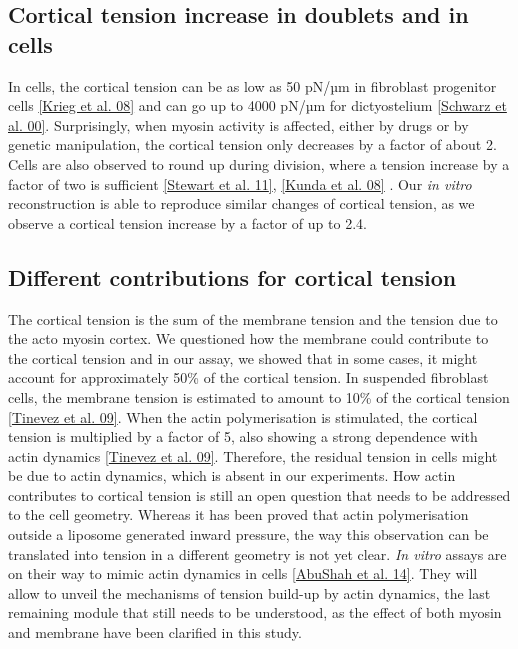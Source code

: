 \documentclass[A4paperpaper,11pt,english]{sphinxmanual}
\begin{document}
\subsection{Cortical tension increase in doublets and in cells}
\label{parts/part4:cortical-tension-increase-in-doublets-and-in-cells}
In cells, the cortical tension can be as low as 50 pN/µm in fibroblast progenitor
cells {\hyperref[parts/part4:krieg2008]{{[}Krieg et al. 08{]}}} and can go up to 4000 pN/µm for
dictyostelium {\hyperref[parts/part4:schwarz2000]{{[}Schwarz et al. 00{]}}}. Surprisingly, when myosin activity is
affected, either by drugs or by genetic manipulation, the cortical tension only
decreases by a factor of about 2. Cells are also observed to round up during
division, where a  tension increase by a factor of two
is sufficient {\hyperref[parts/part4:stewart2011]{{[}Stewart et al. 11{]}}}, {\hyperref[parts/part4:kunda2008]{{[}Kunda et al. 08{]}}} .
Our \emph{in vitro} reconstruction is able to reproduce similar
changes of cortical tension, as we observe a cortical tension increase by a factor of up to 2.4.


\subsection{Different contributions for cortical tension}
\label{parts/part4:different-contributions-for-cortical-tension}
The cortical tension is the sum of the membrane tension and the tension due to the
acto myosin cortex. We questioned how the membrane could contribute to the cortical tension
and in our assay, we showed that in some cases, it might account for approximately 50\% of the cortical tension.
In suspended fibroblast cells, the membrane tension is estimated to amount to 10\% of the
cortical tension {\hyperref[parts/part4:tinevez2009]{{[}Tinevez et al. 09{]}}}. When the actin polymerisation is
stimulated, the cortical tension is multiplied by a factor of 5, also showing a
strong dependence with actin dynamics {\hyperref[parts/part4:tinevez2009]{{[}Tinevez et al. 09{]}}}. Therefore, the
residual tension in cells might be due to actin dynamics, which is absent in our
experiments. How actin contributes to cortical tension is still an open question
that needs to be addressed to the cell geometry.  Whereas it has been proved that actin polymerisation
outside a liposome generated inward pressure,
the way this observation can be translated into tension  in a different geometry is
not yet clear. \emph{In vitro} assays are on their way to mimic actin dynamics in
cells {\hyperref[parts/part4:abushah2014]{{[}AbuShah et al. 14{]}}}. They will allow to unveil the mechanisms of tension build-up by
actin dynamics, the last remaining module that still needs to be understood,
as the effect of both myosin and membrane have been clarified in this study.
\end{document}
